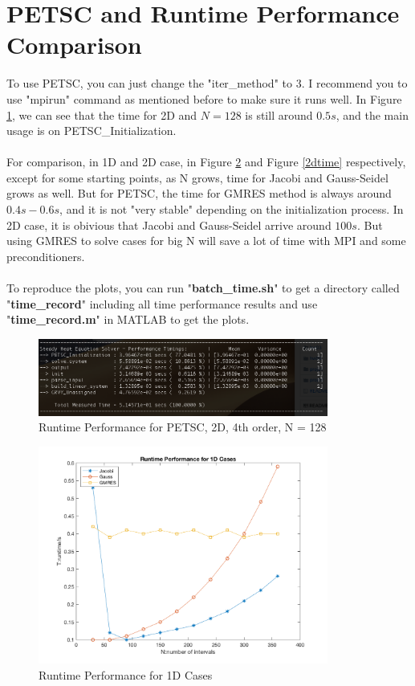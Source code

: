 \documentclass[a4paper]{article}
\begin{document}
\section{PETSC and Runtime Performance Comparison}
To use PETSC, you can just change the "iter\_method" to 3. I recommend you to use "mpirun" command as mentioned before to make sure it runs well. In Figure \ref{pet}, we can see that the time for 2D and $N = 128$ is still around $0.5s$, and the main usage is on PETSC\_Initialization.\\\\
For comparison, in 1D and 2D case, in Figure \ref{1dtime} and Figure \ref{2dtime} respectively, except for some starting points, as N grows, time for Jacobi and Gauss-Seidel grows as well. But for PETSC, the time for GMRES method is always around $0.4s-0.6s$, and it is not "very stable" depending on the initialization process. In 2D case, it is obivious that Jacobi and Gauss-Seidel arrive around $100s$. But using GMRES to solve cases for big N will save a lot of time with MPI and some preconditioners.\\\\
To reproduce the plots, you can run "\textbf{batch\_time.sh}" to get a directory called "\textbf{time\_record}" including all time performance results and use "\textbf{time\_record.m}" in MATLAB to get the plots.

\begin{figure}[htbp]
\centering
\includegraphics[width=0.85\textwidth]{pett.png}
\caption{\label{pet}Runtime Performance for PETSC, 2D, 4th order, N = 128}
\end{figure}

\begin{figure}[htbp]
\centering
\includegraphics[width=0.85\textwidth]{1D_time.png}
\caption{\label{1dtime}Runtime Performance for 1D Cases}
\end{figure}
\end{document}
